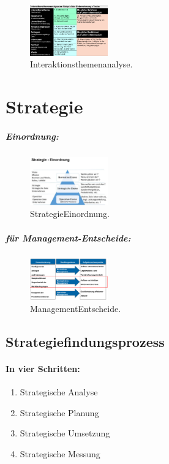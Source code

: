 \documentclass{article}
\begin{document}
\begin{figure}[H]
\centering
\includegraphics[width=0.3\textwidth]{Resources/Image/Interaktionsthemenanalyse.png}
\caption{\label{fig:Interaktionsthemenanalyse}Interaktionsthemenanalyse.}
\end{figure}

\pagebreak
\section{Strategie}
\subparagraph{Einordnung:\\}
\begin{figure}[H]
\centering
\includegraphics[width=0.3\textwidth]{Resources/Image/StrategieEinordnung.png}
\caption{\label{fig:StrategieEinordnung}StrategieEinordnung.}
\end{figure}

\subparagraph{für Management-Entscheide:\\}
\begin{figure}[H]
\centering
\includegraphics[width=0.3\textwidth]{Resources/Image/ManagementEntscheide.png}
\caption{\label{fig:ManagementEntscheide}ManagementEntscheide.}
\end{figure}


\subsection{Strategiefindungsprozess}
\paragraph{In vier Schritten:}
\begin{enumerate}
\item Strategische Analyse
\item Strategische Planung
\item Strategische Umsetzung
\item Strategische Messung
\end{enumerate}
\end{document}

